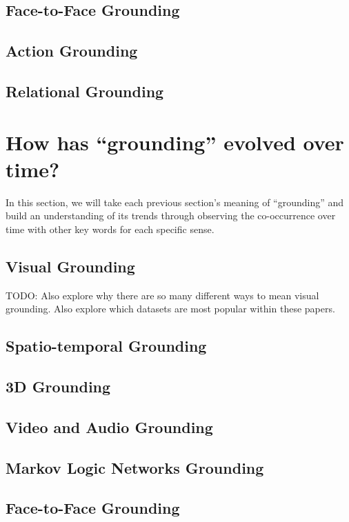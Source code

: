 \documentclass[11pt]{article}
\begin{document}
\subsection{Face-to-Face Grounding}

\subsection{Action Grounding}

\subsection{Relational Grounding}

\section{How has ``grounding'' evolved over time?}
In this section, we will take each previous section's meaning of ``grounding'' and build an understanding of its trends through observing the co-occurrence over time with other key words for each specific sense.

\subsection{Visual Grounding}
TODO: Also explore why there are so many different ways to mean visual grounding. Also explore which datasets are most popular within these papers.

\subsection{Spatio-temporal Grounding}

\subsection{3D Grounding}

\subsection{Video and Audio Grounding}

\subsection{Markov Logic Networks Grounding}

\subsection{Face-to-Face Grounding}
\end{document}
